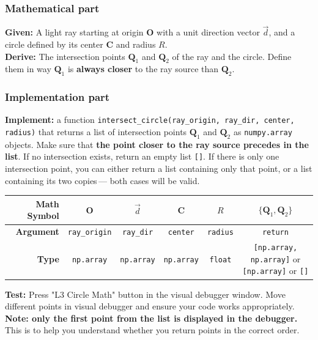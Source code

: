\documentclass[11pt]{article}
\begin{document}
\subsubsection*{Mathematical part}
\textbf{Given:} A light ray starting at origin $\mathbf{O}$ with a unit direction vector $\vec{d}$, and a circle defined by its center $\mathbf{C}$ and radius $R$. \\
\textbf{Derive:} The intersection points $\mathbf{Q}_1$ and $\mathbf{Q}_2$ of the ray and the circle. Define them in way $\mathbf{Q}_1$ is \textbf{always closer} to the ray source than $\mathbf{Q}_2$.

\subsubsection*{Implementation part}\textbf{Implement:} a function \lstinline|intersect_circle(ray_origin, ray_dir, center, radius)| that returns a list of intersection points $\mathbf{Q}_1$ and $\mathbf{Q}_2$ as \lstinline|numpy.array| objects. Make sure that \textbf{the point closer to the ray source precedes in the list}. If no intersection exists, return an empty list \lstinline|[]|. If there is only one intersection point, you can either return a list containing only that point, or a list containing its two copies\,--- both cases will be valid.
\begin{center}
\renewcommand{\arraystretch}{2.0}
\begin{tabular}{r | c | c | c | c | c}
\toprule
\textbf{Math Symbol} & $\mathbf{O}$ & $\vec{d}$ & $\mathbf{C}$ & $R$ & $\{\mathbf{Q}_1, \mathbf{Q}_2\}$ \\
\midrule\textbf{Argument} & \lstinline|ray_origin| & \lstinline|ray_dir| & \lstinline|center| & \lstinline|radius| & \lstinline|return| \\
\midrule
\textbf{Type} & \lstinline|np.array| & \lstinline|np.array| & \lstinline|np.array| & \lstinline|float| & \parbox{5cm}{\lstinline|[np.array, np.array]| or\\ \lstinline|[np.array]| or \lstinline|[]|} \\
\bottomrule
\end{tabular}
\end{center}
\textbf{Test:} Press "L3 Circle Math" button in the visual debugger window. Move different points in visual debugger and ensure your code works appropriately. \textbf{Note: only the first point from the list is displayed in the debugger.} This is to help you understand whether you return points in the correct order.
\end{document}
